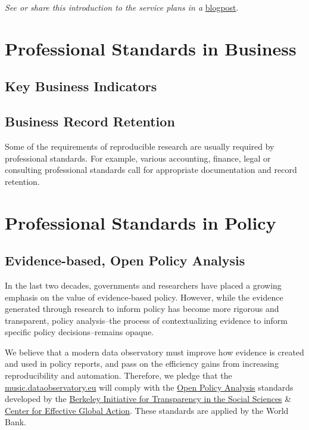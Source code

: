 \documentclass[
  a4paper,
  openany, a4paper, oneside]{book}
\begin{document}
\emph{See or share this introduction to the service plans in a} \href{https://dataandlyrics.com/post/2021-06-18-gold-without-rush/}{blogpost}.

\hypertarget{business-professional-standards}{%
\section{Professional Standards in Business}\label{business-professional-standards}}

\hypertarget{key-business-indicators}{%
\subsection{Key Business Indicators}\label{key-business-indicators}}

\hypertarget{business-record-retention}{%
\subsection{Business Record Retention}\label{business-record-retention}}

Some of the requirements of reproducible research are usually required by professional standards. For example, various accounting, finance, legal or consulting professional standards call for appropriate documentation and record retention.

\hypertarget{policy-professional-standards}{%
\section{Professional Standards in Policy}\label{policy-professional-standards}}

\hypertarget{opa}{%
\subsection{Evidence-based, Open Policy Analysis}\label{opa}}

In the last two decades, governments and researchers have placed a growing emphasis on the value of evidence-based policy. However, while the evidence generated through research to inform policy has become more rigorous and transparent, policy analysis--the process of contextualizing evidence to inform specific policy decisions--remains opaque.

We believe that a modern data observatory must improve how evidence is created and used in policy reports, and pass on the efficiency gains from increasing reproducibility and automation. Therefore, we pledge that the \href{https://music.dataobservatory.eu}{music.dataobservatory.eu} will comply with the \href{https://www.bitss.org/opa/}{Open Policy Analysis} standards developed by the \href{https://www.bitss.org/}{Berkeley Initiative for Transparency in the Social Sciences} \& \href{https://cega.berkeley.edu/}{Center for Effective Global Action}. These standards are applied by the World Bank.
\end{document}
